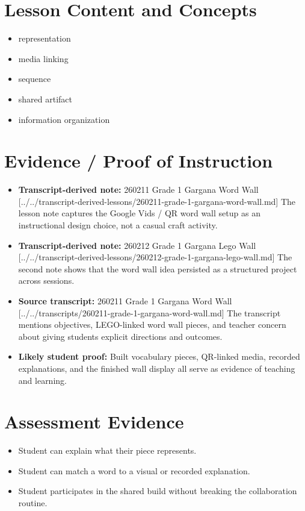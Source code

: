 \documentclass[11pt]{article}
\begin{document}
\section*{Lesson Content and Concepts}
\begin{itemize}[leftmargin=*]
\item representation
\item media linking
\item sequence
\item shared artifact
\item information organization
\end{itemize}

\section*{Evidence / Proof of Instruction}
\begin{itemize}[leftmargin=*]
\item \textbf{Transcript-derived note:} 260211 Grade 1 Gargana Word Wall [../../transcript-derived-lessons/260211-grade-1-gargana-word-wall.md] The lesson note captures the Google Vids / QR word wall setup as an instructional design choice, not a casual craft activity.
\item \textbf{Transcript-derived note:} 260212 Grade 1 Gargana Lego Wall [../../transcript-derived-lessons/260212-grade-1-gargana-lego-wall.md] The second note shows that the word wall idea persisted as a structured project across sessions.
\item \textbf{Source transcript:} 260211 Grade 1 Gargana Word Wall [../../transcripts/260211-grade-1-gargana-word-wall.md] The transcript mentions objectives, LEGO-linked word wall pieces, and teacher concern about giving students explicit directions and outcomes.
\item \textbf{Likely student proof:} Built vocabulary pieces, QR-linked media, recorded explanations, and the finished wall display all serve as evidence of teaching and learning.
\end{itemize}

\section*{Assessment Evidence}
\begin{itemize}[leftmargin=*]
\item Student can explain what their piece represents.
\item Student can match a word to a visual or recorded explanation.
\item Student participates in the shared build without breaking the collaboration routine.
\end{itemize}
\end{document}
